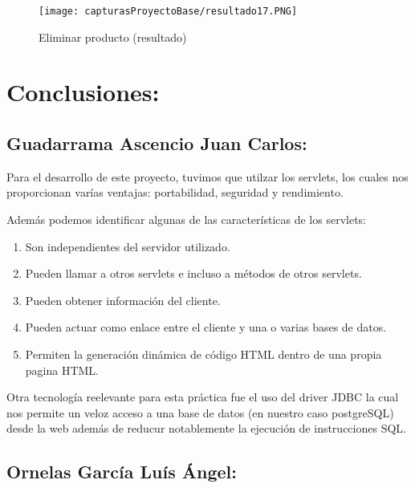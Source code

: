 \documentclass[titlepage, 12pt]{article}
\begin{document}
    \clearpage
    
    \begin{figure}[h]
        \caption{Eliminar producto (resultado)}
        \centering
        \texttt{[image: capturasProyectoBase/resultado17.PNG]} \par\vspace{0.5cm}
    \end{figure}

\pagebreak

\section{Conclusiones:}
\subsection{Guadarrama Ascencio Juan Carlos:}

Para el desarrollo de este proyecto, tuvimos que utilzar los servlets, los cuales nos proporcionan varías ventajas: portabilidad, seguridad y rendimiento.

Además podemos identificar algunas de las características de los servlets:

    \begin{enumerate}
        \item Son independientes del servidor utilizado.
        \item Pueden llamar a otros servlets e incluso a métodos de otros servlets.
        \item Pueden obtener información del cliente.
        \item Pueden actuar como enlace entre el cliente y una o varias bases de datos.
        \item Permiten la generación dinámica de código HTML dentro de una propia pagina HTML.
    \end{enumerate}
    
Otra tecnología reelevante para esta práctica fue el uso del driver JDBC la cual nos permite un veloz acceso a una base de datos (en nuestro caso postgreSQL) desde la web además de reducur notablemente la ejecución de instrucciones SQL.
\subsection{Ornelas García Luís Ángel:}
\end{document}
